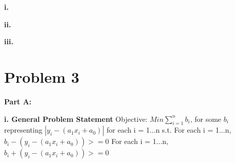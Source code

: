 \documentclass[paper=a4, fontsize=11pt]{scrartcl} %
\numberwithin{equation}{section} %
\numberwithin{figure}{section} %
\numberwithin{table}{section} %
\begin{document}
    \textbf{i.}
    
    \textbf{ii.}
    
    \textbf{iii.}
    
\section{Problem 3}
\textbf{Part A:}

    \textbf{i. General Problem Statement}\newline
	Objective:\newline    
    $Min \sum_{i=1}^{n}{b_i}$, for some $b_i$ representing $|y_i - (a_1x_i + a_0)|$ for each i = 1...n\newline
    s.t.\newline
    For each i = 1...n, $b_i - (y_i - (a_1x_i + a_0)) >= 0$\newline
    For each i = 1...n, $b_i + (y_i - (a_1x_i + a_0)) >= 0$\newline
    
\end{document}
